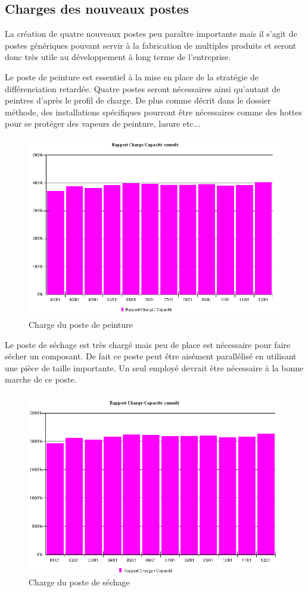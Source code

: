 \documentclass[a4paper]{TPInsa}
\begin{document}
	\subsection{Charges des nouveaux postes}
	La création de quatre nouveaux postes peu paraître importante mais il s'agit de postes génériques pouvant servir à la fabrication de multiples produits et seront donc très utile au développement à long terme de l'entreprise. 
	
	Le poste de peinture est essentiel à la mise en place de la stratégie de différenciation retardée. Quatre postes seront nécessaires ainsi qu'autant de peintres d'après le profil de charge. De plus comme décrit dans le dossier méthode, des installations spécifiques pourront être nécessaires comme des hottes pour se protéger des vapeurs de peinture, lasure etc...
	\begin{figure}[H]
	\centering
	\includegraphics[scale=0.6]{captures/charge_pein.PNG}
	\caption{Charge du poste de peinture}
	\end{figure}
	
	Le poste de séchage est très chargé mais peu de place est nécessaire pour faire sécher un composant. De fait ce poste peut être aisément parallélisé en utilisant une pièce de taille importante. Un seul employé devrait être nécessaire à la bonne marche de ce poste.
	\begin{figure}[H]
	\centering
	\includegraphics[scale=0.6]{captures/sechage.PNG}
	\caption{Charge du poste de séchage}
	\end{figure}
	
\end{document}
